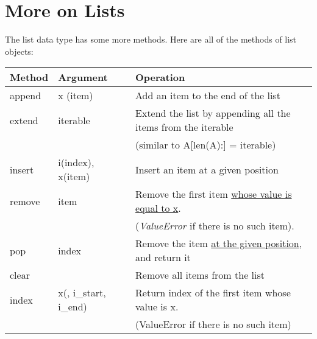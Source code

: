 \vspace{-1cm}
\section{More on Lists}

The list data type has some more methods. Here are all of the methods of list objects:
\renewcommand{\arraystretch}{1.5}
\begin{table}[htb]
\centering
\begin{tabular}{|l|l|l|}
\textbf{Method} & \textbf{Argument}      & \textbf{Operation}                                                                                       \\
\hline\hline
append          & x (item)               & Add an item to the end of the list                                                                       \\
\hline
extend          & iterable               & Extend the list by appending all the items from the iterable                                             \\
                &                        & (similar to A[len(A):] = iterable)                                                                       \\
\hline
insert          & i(index), x(item)      & Insert an item at a given position                                                                       \\
\hline
remove          & item                   & Remove the first item \uline{whose value is equal to x}.                                                 \\
                &                        & (\textit{ValueError} if there is no such item).                                                          \\
\hline
pop             & index                  & Remove the item \uline{at the given position}, and return it                                             \\
\hline
clear           &                        & Remove all items from the list                                                                           \\
\hline
index           & x(, i\_start, i\_end)  & Return index of the first item whose value is x.                                                         \\
                &                        & (ValueError if there is no such item)                                                                    \\

\end{tabular}
\end{table}
